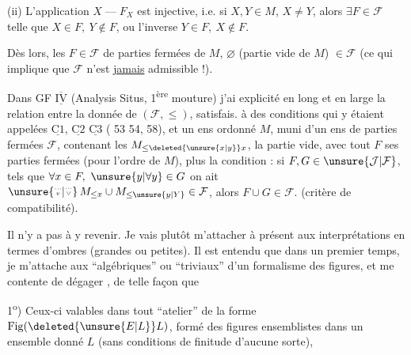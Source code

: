 (ii) L'application $X\mathrel{\text{---}}F_{X}$ est injective, i.e. si $X,Y\in M$, $X\ne Y$, alors $\exists F\in\mathcal{F}$ telle que $X\in F,\ Y\notin F$, ou l'inverse $Y\in F,\ X\notin F$.

Dès lors, les $F\in\mathcal{F}$   de parties fermées de $M$,    $\varnothing$ (partie vide de $M$) $\in\mathcal{F}$ (ce qui implique que $\mathcal{F}$ n'est \uline{jamais} admissible !).

Dans GF $\overline{\underline{\mathrm{IV}}}$ (Analysis Situs, 1\textsuperscript{ère} mouture) j'ai explicité en long et en large la relation entre la donnée de $(\mathcal{F},\leq)$, satisfais. à des conditions qui y étaient appelées $\underline{\mathrm{C1}}$, $\underline{\mathrm{C2}}$ $\underline{\mathrm{C3}}$ ( 53 54, 58),
 et un ens ordonné $M$, muni d'un ens de parties fermées $\mathcal{F}$, contenant les $M_{\leq\deleted{\unsure{x|y}}x}$, la partie vide,  avec tout $F$ ses parties fermées (pour l'ordre de $M$), plus la condition : si $F,G\in\unsure{\mathcal{J}|\mathcal{F}}$, tels que $\forall x\in F,\ \unsure{y|\forall y}\in G$ on ait $\unsure{\overset{\scriptscriptstyle\cdots}{\scriptscriptstyle v}|\overset{\scriptscriptstyle\cdots}{\scriptscriptstyle\vee}}\,M_{\leq x}\cup M_{\leq\unsure{y|Y}}\in\mathcal{F}$, alors $F\cup G\in\mathcal{F}$. (critère de compatibilité).


Il n'y a pas à y revenir. Je vais plutôt m'attacher à présent aux interprétations en termes d'ombres (grandes ou petites). Il est entendu que dans un premier temps, je m'attache aux  ``algébriques'' ou ``triviaux'' d'un formalisme des figures, et me contente de dégager   , de telle façon que

1\textsuperscript{o}) Ceux-ci  valables dans tout ``atelier'' de la forme $\mathrm{Fig}(\deleted{\unsure{E|L}}L)$, formé des figures ensemblistes dans un ensemble donné $L$ (sans conditions de finitude d'aucune sorte),

